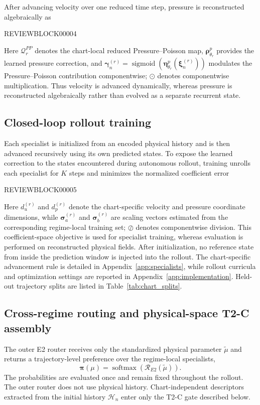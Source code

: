 \documentclass{article}
\begin{document}
After advancing velocity over one reduced time step, pressure is reconstructed algebraically as


REVIEWBLOCK00004


Here $\mathcal Q_r^{PP}$ denotes the chart-local reduced Pressure--Poisson map, $\bm\rho^p_{\theta_r}$ provides the learned pressure correction, and $\bm\gamma_n^{(r)} =\operatorname{sigmoid}(\bm\eta^p_{\theta_r}(\bm\xi_n^{(r)}))$ modulates the Pressure--Poisson contribution componentwise; $\odot$ denotes componentwise multiplication. Thus velocity is advanced dynamically, whereas pressure is reconstructed algebraically rather than evolved as a separate recurrent state.


\subsection{Closed-loop rollout training}

Each specialist is initialized from an encoded physical history and is then advanced recursively using its own predicted states. To expose the learned correction to the states encountered during autonomous rollout, training unrolls each specialist for $K$ steps and minimizes the
normalized coefficient error


REVIEWBLOCK00005


Here $d_u^{(r)}$ and $d_p^{(r)}$ denote the chart-specific velocity and pressure coordinate dimensions, while $\bm\sigma_a^{(r)}$ and $\bm\sigma_b^{(r)}$ are scaling
vectors estimated from the corresponding regime-local training set; $\oslash$ denotes componentwise division. This coefficient-space objective is used for specialist training, whereas evaluation is performed on reconstructed physical fields. After initialization, no reference state from inside the prediction window is injected into the rollout. The chart-specific advancement rule is detailed in Appendix~\ref{app:specialists}, while rollout curricula and optimization settings are reported in Appendix~\ref{app:implementation}. Held-out trajectory splits are listed in Table~\ref{tab:chart_splits}.



\subsection{Cross-regime routing and physical-space T2-C assembly}

The outer E2 router receives only the standardized physical parameter $\widetilde\mu$ and returns a trajectory-level preference over the
regime-local specialists,
\[
\bm\pi(\mu)
=
\operatorname{softmax}\!\left(
\mathcal R_{E2}(\widetilde\mu)
\right).
\]
The probabilities are evaluated once and remain fixed throughout the rollout. The outer router does not use physical history. Chart-independent descriptors extracted from the initial history $\mathcal H_n$ enter only the T2-C gate described below.
\end{document}

